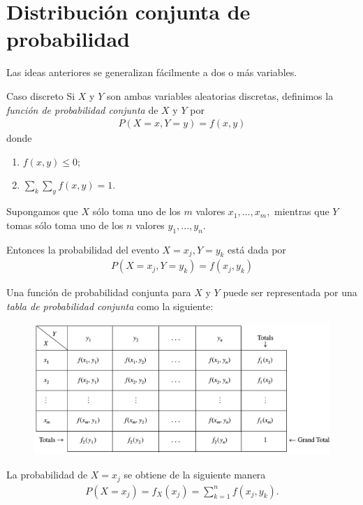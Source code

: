 \section{Distribución conjunta de probabilidad}


	Las ideas anteriores se generalizan fácilmente a dos o más variables.


{Caso discreto}
	Si $X$ y $Y$ son ambas variables aleatorias discretas, definimos la \emph{función de probabilidad conjunta} de $X$ y $Y$ por
	\begin{align}
	\label{2.13}
		P(X=x, Y=y)=f(x,y)
	\end{align}
 donde
\begin{enumerate}
	\item $f(x,y)\leq 0;$
	\item $\sum_{k}\sum_{y}f(x,y)=1.$
\end{enumerate}




	Supongamos que $X$ sólo toma uno de los $m$ valores $x_{1},...,x_{m},$ mientras que $Y$ tomas sólo toma uno de los $n$ valores $y_{1},...,y_{n}.$

	Entonces la probabilidad del evento $X=x_{j}, Y=y_{k}$ está dada por
	\begin{align}
	\label{2.14}
		P(X=x_{j}, Y=y_{k})=f(x_{j},y_{k})
	\end{align}



	Una función de probabilidad conjunta para $X$ y $Y$ puede ser representada por una \emph{tabla de probabilidad conjunta} como la siguiente:
	\begin{figure}[h]
	\centering
	\includegraphics[height=5cm,keepaspectratio=true]{./pe/tab0203.png}
	\label{tab:0203}
\end{figure}



	La probabilidad de $X=x_{j}$ se obtiene de la siguiente manera
	\begin{align}
	\label{2.15}
		P(X=x_{j})=f_{X}(x_{j})=\sum_{k=1}^{n}f(x_{j},y_{k}).
	\end{align}



